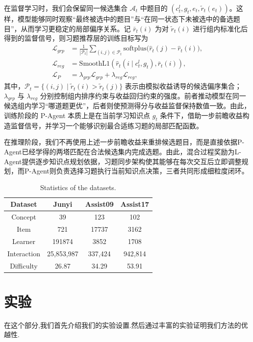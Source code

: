 \documentclass[11pt,a4paper]{article}
\begin{document}
在监督学习时，我们会保留同一候选集合 $\mathcal{A}_t$ 中题目的 $(c_t^l,g_t,e_t,\tilde{r}_t(e_t))$。这样，模型能够同时观察“最终被选中的题目”与“在同一状态下未被选中的备选题目”，从而学习更稳定的局部偏序关系。记 $\bar{r}_t(i)$ 为对 $\tilde{r}_t(i)$ 进行组内标准化后得到的监督信号，则习题推荐层的训练目标写为
\begin{equation}
\begin{aligned}
\mathcal{L}_{grp}
&=
\frac{1}{|\mathcal{P}_t|}
\sum_{(i,j)\in\mathcal{P}_t}
\mathrm{softplus}\!\big(
\hat{r}_{t}(j)-\hat{r}_{t}(i)
\big),\\
\mathcal{L}_{reg}
&=
\mathrm{SmoothL1}\!\left(
\hat{r}_{t}(i\mid c_t^l,g_t),\bar{r}_t(i)
\right),\\
\mathcal{L}_{P}
&=
\lambda_{grp} \mathcal{L}_{grp}
+
\lambda_{reg} \mathcal{L}_{reg},
\end{aligned}
\end{equation}
其中，$\mathcal{P}_t=\{(i,j)\mid \tilde{r}_t(i)>\tilde{r}_t(j)\}$ 表示由模拟收益诱导的候选偏序集合；$\lambda_{grp}$ 与 $\lambda_{reg}$ 分别控制组内排序约束与收益回归约束的强度。前者推动模型在同一候选组内学习“哪道题更优”，后者则使预测得分与收益监督保持数值一致。由此，训练阶段的 P-Agent 本质上是在当前学习知识点 $g_t$ 条件下，借助一步前瞻收益构造监督信号，并学习一个能够识别最合适练习题的局部匹配函数。

在推理阶段，我们不再使用上述一步前瞻收益来重排候选题目，而是直接依据P-Agent已经学得的两塔匹配在合法候选集内完成选题。由此，混合过程奖励为L-Agent提供逐步知识点规划依据，习题同步架构使其能够在每次交互后立即调整规划，而P-Agent则负责选择习题执行当前知识点决策，三者共同形成细粒度闭环。
\begin{table}[H]
\centering
\captionsetup{labelfont=bf,textfont=bf}
\caption{Statistics of the datasets.}
\label{tab:datasets}
\setlength{\tabcolsep}{4pt}
\footnotesize
\begin{tabular}{cccc}
\toprule
\textbf{Dataset} & \textbf{Junyi} & \textbf{Assist09} & \textbf{Assist17}  \\
\midrule
Concept & 39 & 123 & 102 \\
Item & 721 & 17737 & 3162 \\
Learner & 191874 & 3852 & 1708 \\
Interaction & 25,853,987 & 337,424 & 942,814 \\
Difficulty & 26.87 & 34.29 & 53.91 \\
\bottomrule
\end{tabular}
\end{table}
\section{实验}
在这个部分,我们首先介绍我们的实验设置.然后通过丰富的实验证明我们方法的优越性.
\end{document}
